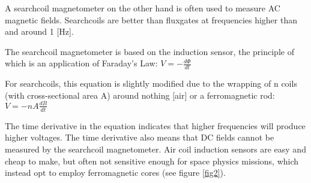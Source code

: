 A searchcoil magnetometer on the other hand is often used to measure AC
magnetic fields. Searchcoils are better than fluxgates at frequencies
higher than and around 1 [Hz]. \citep{coillot2012} 

The searchcoil magnetometer is based on the induction sensor, the
principle of which is an application of Faraday's Law:
\begin{math}
  V = -\frac{d\Phi}{dt}
\end{math}

For searchcoils, this equation is slightly modified due to the wrapping
of n coils (with cross-sectional area A) around nothing [air] or a ferromagnetic rod:
\begin{math}
  V=-nA\frac{dB}{dt}
\end{math}

The time derivative in the equation indicates that higher frequencies
will produce higher voltages. The time derivative also means that DC
fields cannot be measured by the searchcoil magnetometer. Air coil
induction sensors are easy and cheap to make, but often not sensitive
enough for space physics missions, which instead opt to employ
ferromagnetic cores (see figure \ref{fig2}).
